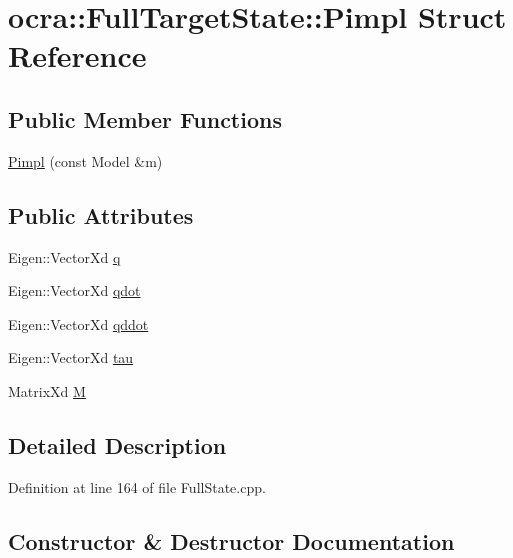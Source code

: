 \hypertarget{structocra_1_1FullTargetState_1_1Pimpl}{}\section{ocra\+:\+:Full\+Target\+State\+:\+:Pimpl Struct Reference}
\label{structocra_1_1FullTargetState_1_1Pimpl}
\subsection*{Public Member Functions}
\begin{DoxyCompactItemize}
\item 
\hyperlink{structocra_1_1FullTargetState_1_1Pimpl_abf41bdded179528f89726ae9071f1377}{Pimpl} (const Model \&m)
\end{DoxyCompactItemize}
\subsection*{Public Attributes}
\begin{DoxyCompactItemize}
\item 
Eigen\+::\+Vector\+Xd \hyperlink{structocra_1_1FullTargetState_1_1Pimpl_afb9abfe35480d2dea95ed9d54e8906df}{q}
\item 
Eigen\+::\+Vector\+Xd \hyperlink{structocra_1_1FullTargetState_1_1Pimpl_a2d1307a89fa37ddb50305785e7d91e68}{qdot}
\item 
Eigen\+::\+Vector\+Xd \hyperlink{structocra_1_1FullTargetState_1_1Pimpl_a6eb86dcb00ed58935f11c42f030645a3}{qddot}
\item 
Eigen\+::\+Vector\+Xd \hyperlink{structocra_1_1FullTargetState_1_1Pimpl_aae33a52895f1ead1be869d88b3e6ff9f}{tau}
\item 
Matrix\+Xd \hyperlink{structocra_1_1FullTargetState_1_1Pimpl_aaf42a0f7ecf1e3750695edc06fb06c11}{M}
\end{DoxyCompactItemize}


\subsection{Detailed Description}


Definition at line 164 of file Full\+State.\+cpp.



\subsection{Constructor \& Destructor Documentation}
\hypertarget{structocra_1_1FullTargetState_1_1Pimpl_abf41bdded179528f89726ae9071f1377}{}\label{structocra_1_1FullTargetState_1_1Pimpl_abf41bdded179528f89726ae9071f1377} 
